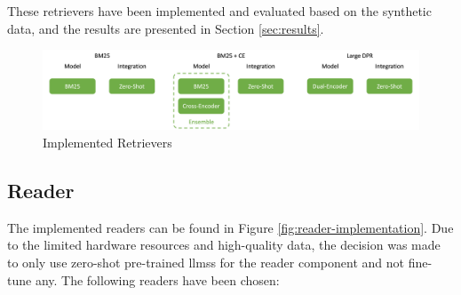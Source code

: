 These retrievers have been implemented and evaluated based on the synthetic data, and the results are presented in Section \ref{sec:results}.

\begin{figure}
    \centering
    \includegraphics[width=\textwidth]{Grafiken/Evaluation/retriever_implemented.png}    
    \caption{Implemented Retrievers}
    \label{fig:retriever-implementation}
\end{figure}

\subsection{Reader}
\label{subsec:reader-impl}

The implemented readers can be found in Figure \ref{fig:reader-implementation}. Due to the limited hardware resources and high-quality data, the decision was made to only use zero-shot pre-trained \glspl{llm}s for the reader component and not fine-tune any. The following readers have been chosen:

